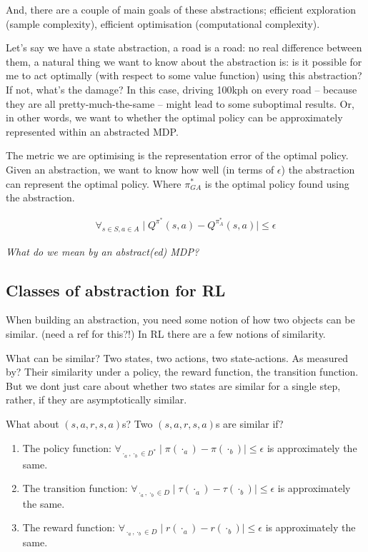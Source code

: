 And, there are a couple of main goals of these abstractions; efficient exploration
(sample complexity), efficient optimisation (computational complexity).

Let's say we have a state abstraction, a road is a road: no real difference
between them, a natural thing we want to know about the abstraction is:
is it possible for me to act optimally (with respect to some value function)
using this abstraction? If not, what's the damage? In this case, driving 100kph on every road --
because they are all pretty-much-the-same -- might lead to some suboptimal results.
Or, in other words, we want to whether the optimal policy can be approximately represented within an abstracted MDP.

The metric we are optimising is the representation error of the optimal
policy. Given an abstraction, we want to know how well (in terms of $\epsilon$)
the abstraction can represent the optimal policy. Where $\pi_{GA}^{* }$ is the
optimal policy found using the abstraction.

\begin{align}
\forall_{s\in S, a\in A} \mid Q^{\pi^* }(s, a) - Q^{\pi_{A}^* }(s, a) \mid \le \epsilon
\end{align}

\cite{Littman2006, Abel2017}

\begin{displayquote}
\textit{What do we mean by an abstract(ed) MDP?}
\end{displayquote}

\subsection{Classes of abstraction for RL}

When building an abstraction, you need some notion of how two objects can be similar. (need a ref for this?!)
In RL there are a few notions of similarity.

What can be similar? Two states, two actions, two state-actions.
As measured by? Their similarity under a policy, the reward function, the transition function.
But we dont just care about whether two states are similar for a single step, rather, if they are asymptotically similar.

What about $(s, a, r, s, a)$s? Two $(s, a, r, s, a)$s are similar if?

\begin{enumerate}
\tightlist
\item
  The policy function:
  \(\forall_{\cdot_a, \cdot_b \in D^{* }} \mid \pi(\cdot_a) - \pi(\cdot_b) \mid \le \epsilon\)
  is approximately the same.
\item
  The transition function:
  \(\forall_{\cdot_a, \cdot_b \in D} \mid \tau(\cdot_a) - \tau(\cdot_b)\mid \le \epsilon\)
  is approximately the same.
\item
  The reward function:
  \(\forall_{\cdot_a, \cdot_b \in D} \mid r(\cdot_a) - r(\cdot_b) \mid \le \epsilon\)
  is approximately the same.
\end{enumerate}

